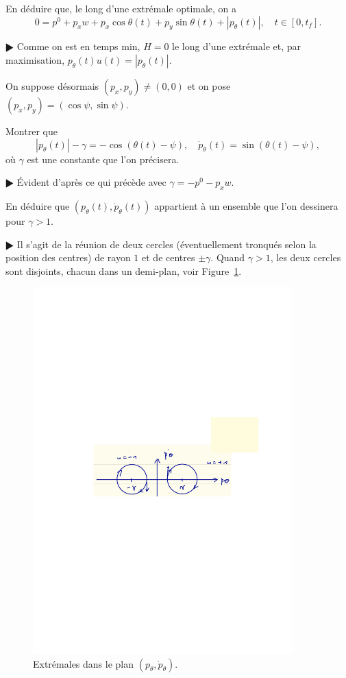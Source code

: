 \documentclass[11pt,a4paper]{article}
\theoremstyle{plain}
\theoremstyle{definition}
\begin{document}
\begin{Exercice}[10 points]
\begin{Question} En d\'eduire que, le long d'une extr\'emale optimale, on a
\[ 0 = p^0+p_x w+p_x\cos\theta(t)+p_y\sin\theta(t)+|p_\theta(t)|,\quad t \in [0,t_f]. \]
\end{Question}
\begin{corr} $\RHD$ Comme on est en temps min, $H=0$ le long d'une extr\'emale et, par
maximisation, $p_\theta(t)u(t)=|p_\theta(t)|$.
\end{corr}

On suppose d\'esormais $(p_x,p_y) \neq (0,0)$ et on pose $(p_x,p_y)=(\cos\psi,\sin\psi)$.

\begin{Question} Montrer que
\[ |p_\theta(t)|-\gamma =-\cos(\theta(t)-\psi),\quad 
   \dot{p}_\theta(t) = \sin(\theta(t)-\psi), \]
o\`u $\gamma$ est une constante que l'on pr\'ecisera.
\end{Question}
\begin{corr} $\RHD$ \'Evident d'apr\`es ce qui pr\'ec\`ede avec $\gamma=-p^0-p_x w$.
\end{corr}

\begin{Question} En d\'eduire que $(p_\theta(t),\dot{p}_\theta(t))$ appartient \`a un
ensemble que l'on dessinera pour $\gamma > 1$.
\end{Question}
\begin{corr} $\RHD$ Il s'agit de la r\'eunion de deux cercles (\'eventuellement
tronqu\'es selon la position des centres) de rayon $1$ et de centres $\pm \gamma$.
Quand $\gamma > 1$, les deux cercles sont disjoints, chacun dans un demi-plan, voir
Figure~\ref{fig2}.
\begin{figure}[t]
\includegraphics[width=10cm]{fig2} \centering
\caption{Extr\'emales dans le plan $(p_\theta,\dot{p}_\theta)$.}
\label{fig2}
\end{figure}
\end{corr}


\end{Exercice}
\end{document}
